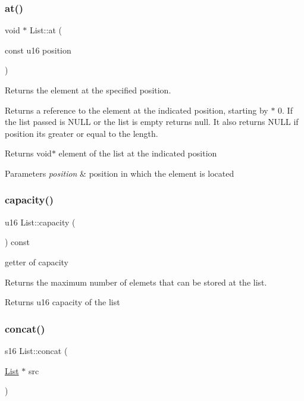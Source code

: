 \subsubsection{\texorpdfstring{at()}{at()}}
{\footnotesize\ttfamily void $\ast$ List\+::at (\begin{DoxyParamCaption}\item[{const u16}]{position }\end{DoxyParamCaption})}



Returns the element at the specified position. 

Returns a reference to the element at the indicated position, starting by $\ast$ 0. If the list passed is N\+U\+LL or the list is empty returns null. It also returns N\+U\+LL if position it\textquotesingle{}s greater or equal to the length.

\begin{DoxyReturn}{Returns}
void$\ast$ element of the list at the indicated position 
\end{DoxyReturn}

\begin{DoxyParams}{Parameters}
{\em position} & position in which the element is located \\
\hline
\end{DoxyParams}
\mbox{\label{class_list_a6c7a40924805f3a51e32f5685bf21e38}} 
\subsubsection{\texorpdfstring{capacity()}{capacity()}}
{\footnotesize\ttfamily u16 List\+::capacity (\begin{DoxyParamCaption}{ }\end{DoxyParamCaption}) const}



getter of capacity 

Returns the maximum number of elemets that can be stored at the list.

\begin{DoxyReturn}{Returns}
u16 capacity of the list 
\end{DoxyReturn}
\mbox{\label{class_list_a31a2d683f5393b21d75c797a9cb22362}} 
\subsubsection{\texorpdfstring{concat()}{concat()}}
{\footnotesize\ttfamily s16 List\+::concat (\begin{DoxyParamCaption}\item[{\hyperlink{class_list}{List} $\ast$}]{src }\end{DoxyParamCaption})}



